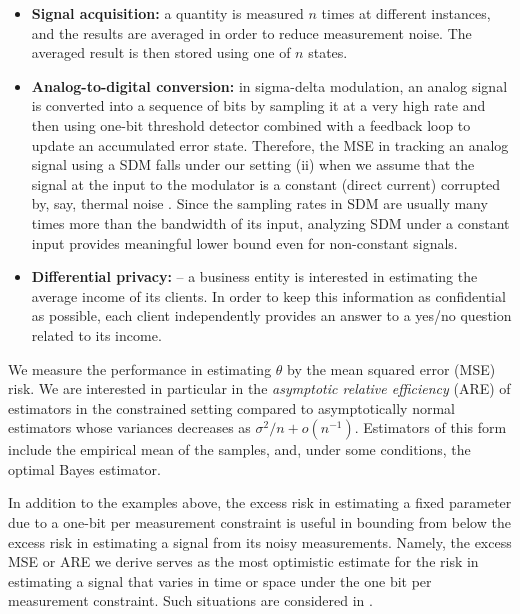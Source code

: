 \documentclass[letterpaper, 11pt]{IEEEtran}      %
\begin{document}
\begin{itemize}
\item {\bf Signal acquisition:} a quantity is measured $n$ times at different instances, and the results are averaged in order to reduce measurement noise. The averaged result is then stored using one of $n$ states. 
\item {\bf Analog-to-digital conversion:} in sigma-delta modulation, an analog signal is converted into a sequence of bits by sampling it at a very high rate and then using one-bit threshold detector combined with a feedback loop to update an accumulated error state. Therefore, the MSE in tracking an analog signal using a SDM falls under our setting (ii) when we assume that the signal at the input to the modulator is a constant (direct current) corrupted by, say, thermal noise \cite{53738}. Since the sampling rates in SDM are usually many times more than the bandwidth of its input, analyzing SDM under a constant input provides meaningful lower bound even for non-constant signals.
\item {\bf Differential privacy:} -- a business entity is interested in estimating the average income of its clients. In order to keep this information as confidential as possible, each client independently provides an answer to a yes/no question related to its income.
\end{itemize}
%
We measure the performance in estimating $\theta$ by the mean squared error (MSE) risk. We are interested in particular in the \emph{asymptotic relative efficiency} (ARE) of estimators in the constrained setting compared to asymptotically normal estimators whose variances decreases as $\sigma^2/n+o(n^{-1})$. Estimators of this form include the empirical mean of the samples, and, under some conditions, the optimal Bayes estimator. \par
%
In addition to the examples above, the excess risk in estimating a fixed parameter due to a one-bit per measurement constraint is useful in bounding from below the excess risk in estimating a signal from its noisy measurements. Namely, the excess MSE or ARE we derive serves as the most optimistic estimate for the risk in estimating a signal that varies in time or space under the one bit per measurement constraint. Such situations are considered in \cite{baraniuk2017exponential, jacques2013robust, plan2013one, li2017channel, choi2016near}. \\


\end{document}
